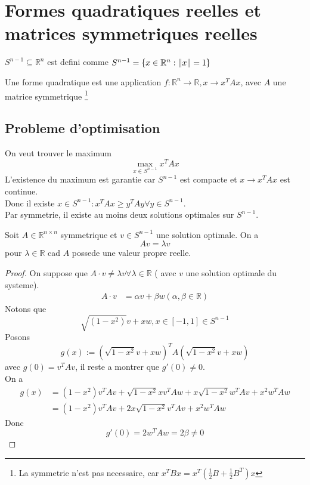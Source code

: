 \documentclass[../main.tex]{subfiles}
\begin{document}
\section{Formes quadratiques reelles et matrices symmetriques reelles}
\begin{defn}[Sphere]
	$S^{n-1}\subseteq \mathbb{R}^n$ est defini comme $S^{n-1}= \left\{ x \in \mathbb{R}^{n}: \left\lVert x\right\rVert =1 \right\} $
\end{defn}
\begin{defn}
	Une forme quadratique est une application $f: \mathbb{R}^n\to \mathbb{R}, x \to x^{T}A x$, avec $A$ une matrice symmetrique \footnote { La symmetrie n'est pas necessaire, car $x^{T}Bx = x^{T}( \frac{1}{2}B + \frac{1}{2}B^{T}) x$}
\end{defn}
\subsection*{Probleme d'optimisation}
On veut trouver le maximum
\[ 
\max_{x\in S^{n-1}} x^{T}Ax
\]
L'existence du maximum est garantie car $S^{n-1}$ est compacte et $x \to x^{T}Ax$ est continue.\\
Donc il existe $x \in S^{n-1}: x^{T}Ax \geq y^{T}A y\forall y \in S^{n-1}$.\\
Par symmetrie, il existe au moins deux solutions optimales sur $S^{n-1}$.
\begin{lemma}
Soit $A \in \mathbb{R}^{n\times n}$ symmetrique et $v \in S^{n-1}$ une solution optimale. On a
\[ 
Av = \lambda v
\]
pour $\lambda\in \mathbb{R}$ cad $A$ possede une valeur propre reelle.
\end{lemma}
\begin{proof}
	On suppose que $A\cdot v\neq \lambda v\forall \lambda \in \mathbb{R}$ ( avec $v$ une solution optimale du systeme).\\
	\begin{align*}
		A\cdot v &= \alpha v + \beta w ( \alpha,\beta\in \mathbb{R}) 
	\end{align*}
Notons que
\[ 
	\sqrt{( 1-x^{2}) } v + xw, x\in [ -1,1] \in S^{n-1}
\]
Posons 
\[ 
	g( x) := ( \sqrt{1- x^{2}} v + xw) ^{T}A ( \sqrt{1-x^{2}} v+ xw) 
\]
avec $g( 0) = v^{T}Av$, il reste a montrer que $g'( 0) \neq 0$.\\
On a
\begin{align*}
	g( x) &= ( 1-x^{2}) v^{T}Av + \sqrt{1-x^{2}} x v^{T}A w + x \sqrt{1-x^{2}} w^{T}A v + x^{2} w^{T}A w\\
	      &= ( 1-x^{2}) v^{T}A v + 2x \sqrt{1-x^{2}} v^{T}Av + x^{2}w^{T}A w
\end{align*}
Donc
\[ 
	g'( 0) = 2 w^{T}Aw = 2\beta \neq 0
\]

\end{proof}
\end{document}
